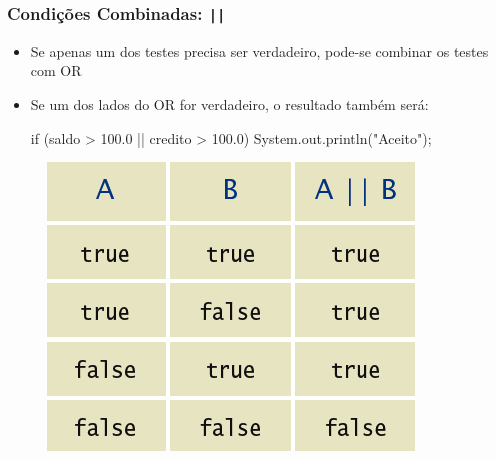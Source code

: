 \documentclass[xcolor={dvipsnames,table},aspectratio=169]{beamer}
\begin{document}
\begin{frame}[fragile]\frametitle{Condições Combinadas: \texttt{||}}
\begin{itemize}
	\item Se apenas um dos testes precisa ser verdadeiro, pode-se combinar os testes com OR
	\item Se um dos lados do OR for verdadeiro, o resultado também será:
{\scriptsize
\begin{javacode}
if (saldo > 100.0 || credito > 100.0) {
   System.out.println("Aceito"); 
}
\end{javacode}
}
\end{itemize}
\begin{figure}[h]
	\includegraphics[height=0.35\paperheight,center]{pucrs-ep-fprog-unidade_03-decisoes-laminas-or.png}
\end{figure}
\end{frame}
\end{document}
